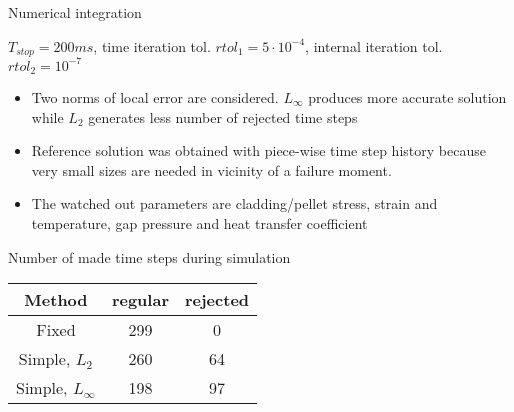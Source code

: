 \begin{frame}{Numerical integration}

    \scriptsize

    $T_{stop}=200ms$, time iteration tol. $rtol_1=5\cdot10^{-4}$, internal iteration tol. $rtol_2=10^{-7}$

    \begin{block}{}
        \begin{itemize}
            \item Two norms of local error are considered. 
                  $L_{\infty}$ produces more accurate solution while $L_2$ generates
                  less number of rejected time steps
            \item Reference solution was obtained with piece-wise time step history because
                  very small sizes are needed in vicinity of a failure moment.
            \item The watched out parameters are cladding/pellet stress, strain and
                  temperature, gap pressure and heat transfer coefficient
        \end{itemize}
    \end{block}

    \begin{center}{}
        Number of made time steps during simulation\\[1pt]
        \begin{tabular}{c | c | c }
            \hline
            Method              & regular & rejected     \\
            \hline
            Fixed               & 299        & 0   \\
            Simple, $L_2$       & 260        & 64  \\
            Simple, $L_\infty$  & 198        & 97  \\
        \end{tabular}
    \end{center}

\end{frame}
